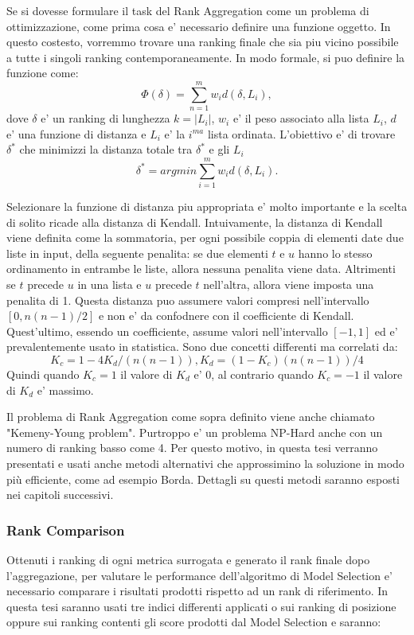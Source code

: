 Se si dovesse formulare il task del Rank Aggregation come un problema di ottimizzazione, come prima cosa e' necessario definire una funzione oggetto. In questo costesto, vorremmo trovare una ranking finale che sia piu vicino possibile a tutte i singoli ranking contemporaneamente. In modo formale, si puo definire la funzione come: \[ \Phi(\delta) = \sum_{n=1}^{m} w_id(\delta,L_i), \]	
dove $\delta$ e' un ranking di lunghezza $k=|L_i|$, $w_i$ e' il peso associato alla lista $L_i$, $d$ e' una funzione di distanza e $L_i$ e' la $i^{ma}$ lista ordinata.
L'obiettivo e' di trovare $\delta^*$ che minimizzi la distanza totale tra $\delta^*$ e gli $L_i$
\[ \delta^* = arg min \sum_{i=1}^{m} w_id(\delta,L_i). \]

Selezionare la funzione di distanza piu appropriata e' molto importante e la scelta di solito ricade alla distanza di Kendall.
Intuivamente, la distanza di Kendall viene definita come la sommatoria, per ogni possibile coppia di elementi date due liste in input, della seguente penalita:
se due elementi $t$ e $u$ hanno lo stesso ordinamento in entrambe le liste, allora nessuna penalita viene data. Altrimenti se $t$ precede $u$ in una lista e $u$ precede $t$ nell'altra, allora viene imposta una penalita di 1.
Questa distanza puo assumere valori compresi nell'intervallo $[0,n(n-1)/2]$ e non e' da confodnere con il coefficiente di Kendall. Quest'ultimo, essendo un coefficiente, assume valori nell'intervallo $[-1,1]$ ed e' prevalentemente usato in statistica. Sono due concetti differenti ma correlati da:
\[K_c=1-4K_d/(n(n-1)), K_d = (1-K_c)(n(n-1))/4\]
Quindi quando $K_c=1$ il valore di $K_d$ e' 0, al contrario quando $K_c=-1$ il valore di $K_d$ e' massimo.

Il problema di Rank Aggregation come sopra definito viene anche chiamato "Kemeny-Young problem". Purtroppo e' un problema NP-Hard anche con un numero di ranking basso come 4. Per questo motivo, in questa tesi verranno presentati e usati anche metodi alternativi che approssimino la soluzione in modo più efficiente, come ad esempio Borda. Dettagli su questi metodi saranno esposti nei capitoli successivi.

\subsubsection{Rank Comparison}
Ottenuti i ranking di ogni metrica surrogata e generato il rank finale dopo l'aggregazione, per valutare le performance dell'algoritmo di Model Selection e' necessario comparare i risultati prodotti rispetto ad un rank di riferimento.
In questa tesi saranno usati tre indici differenti applicati o sui ranking di posizione oppure sui ranking contenti gli score prodotti dal Model Selection e saranno:

